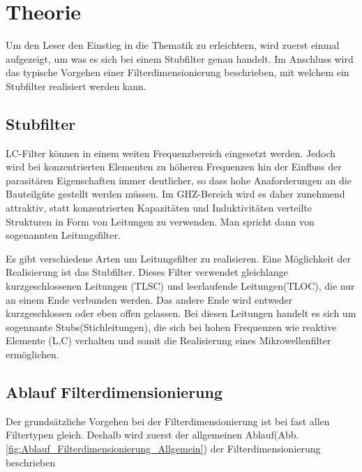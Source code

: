 \section{Theorie}

Um den Leser den Einstieg in die Thematik zu erleichtern, wird zuerst einmal aufgezeigt, um was es sich bei einem Stubfilter genau handelt. Im Anschluss wird das typische Vorgehen einer Filterdimensionierung beschrieben, mit welchem ein Stubfilter realisiert werden kann.

\subsection{Stubfilter}

LC-Filter können in einem weiten Frequenzbereich eingesetzt werden. Jedoch wird bei konzentrierten Elementen zu höheren Frequenzen hin der Einfluss der parasitären Eigenschaften immer deutlicher, so dass hohe Anaforderungen an die Bauteilgüte gestellt werden müssen. Im GHZ-Bereich wird es daher zunehmend attraktiv, statt konzentrierten Kapazitäten und Induktivitäten verteilte Strukturen in Form von Leitungen zu verwenden. Man spricht dann von sogenannten Leitungsfilter.

Es gibt verschiedene Arten um Leitungsfilter zu realisieren. Eine Möglichkeit der Realisierung ist das Stubfilter. Dieses Filter verwendet gleichlange kurzgeschlossenen Leitungen (TLSC) und leerlaufende Leitungen(TLOC), die nur an einem Ende verbunden werden. Das andere Ende wird entweder kurzgeschlossen oder eben offen gelassen. Bei diesen Leitungen handelt es sich um sogennante Stubs(Stichleitungen), die sich bei hohen Frequenzen wie reaktive Elemente (L,C) verhalten und somit die Realisierung eines Mikrowellenfilter ermöglichen.

\newpage


\subsection{Ablauf Filterdimensionierung}

Der grundsätzliche Vorgehen bei der Filterdimensionierung ist bei fast allen Filtertypen gleich. Deshalb wird zuerst der allgemeinen Ablauf(Abb.\ref{fig:Ablauf_Filterdimensionierung_Allgemein}) der Filterdimensionierung beschrieben 


